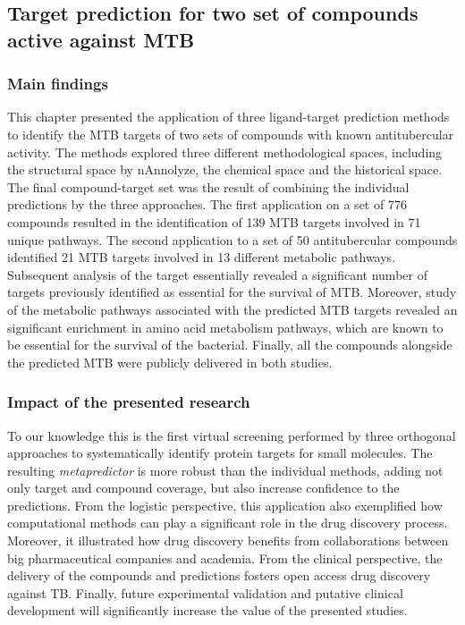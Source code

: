 \documentclass[12pt, b5paper,twoside]{tesi_upf}
\begin{document}
  \subsection{Target prediction for two set of compounds active against MTB}
  

\subsubsection{Main findings} 
\par This chapter presented the application of three ligand-target prediction methods to identify the MTB targets of two sets of compounds with known antitubercular activity. The methods explored three different methodological spaces, including the structural space by nAnnolyze, the chemical space and the historical space. The final compound-target set was the result of combining the individual predictions by the three approaches. The first application on a set of 776 compounds resulted in the identification of 139 MTB targets involved in 71 unique pathways. The second application to a set of 50 antitubercular compounds identified 21 MTB targets involved in 13 different metabolic pathways. Subsequent analysis of the target essentially revealed a significant number of targets previously identified as essential for the survival of MTB. Moreover, study of the metabolic pathways associated with the predicted MTB targets revealed an significant enrichment in amino acid metabolism pathways, which are known to be essential for the survival of the bacterial. Finally, all the compounds alongside the predicted MTB were publicly delivered in both studies. 
 
 \subsubsection{Impact of the presented research} 
 
 
\par To our knowledge this is the first virtual screening performed by three orthogonal approaches to systematically identify protein targets for small molecules. The resulting \textit{metapredictor} is more robust than the individual methods, adding not only target and compound coverage, but also increase confidence to the predictions. From the logistic perspective, this application also exemplified how computational methods can play a significant role in the drug discovery process. Moreover, it illustrated how drug discovery benefits from collaborations between big pharmaceutical companies and academia. From the clinical perspective, the delivery of the compounds and predictions fosters open access drug discovery against TB. Finally, future experimental validation and putative clinical development will significantly increase the value of the presented studies.  
\end{document}
